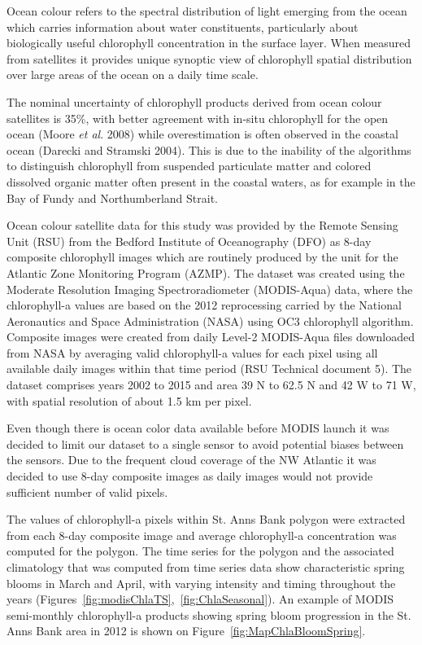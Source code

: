 \documentclass[letterpaper,portrait,11pt]{scrartcl}
\numberwithin{equation}{section}		%
\numberwithin{figure}{section}		%
\numberwithin{table}{section}				%
\begin{document}
Ocean colour refers to the spectral distribution of light emerging from the ocean which carries information about water constituents, particularly about biologically useful chlorophyll concentration in the surface layer. When measured from satellites it provides unique synoptic view of chlorophyll spatial distribution over large areas of the ocean on a daily time scale.

The nominal uncertainty of chlorophyll products derived from ocean colour satellites is 35\%, with better agreement with in-situ chlorophyll for the open ocean (Moore \textit{et al}. 2008) while overestimation is often observed in the coastal ocean (Darecki and Stramski 2004). This is due to the inability of the algorithms to distinguish chlorophyll from suspended particulate matter and colored dissolved organic matter often present in the coastal waters, as for example in the Bay of Fundy and Northumberland Strait.

Ocean colour satellite data for this study was provided by the Remote Sensing Unit (RSU) from the Bedford Institute of Oceanography (DFO) as 8-day composite chlorophyll images which are routinely produced by the unit for the Atlantic Zone Monitoring Program (AZMP). The dataset was created using the Moderate Resolution Imaging Spectroradiometer (MODIS-Aqua) data, where the chlorophyll-a values are based on the 2012 reprocessing carried by the National Aeronautics and Space Administration (NASA) using OC3 chlorophyll algorithm. Composite images were created from daily Level-2 MODIS-Aqua files downloaded from NASA by averaging valid chlorophyll-a values for each pixel using all available daily images within that time period (RSU Technical document 5). The dataset comprises years 2002 to 2015 and area 39 N to 62.5 N and 42 W to 71 W, with spatial resolution of about 1.5 km per pixel. 

Even though there is ocean color data available before MODIS launch it was decided to limit our dataset to a single sensor to avoid potential biases between the sensors. Due to the frequent cloud coverage of the NW Atlantic it was decided to use 8-day composite images as daily images would not provide sufficient number of valid pixels. 

The values of chlorophyll-a pixels within St. Anns Bank polygon were extracted from each 8-day composite image and average chlorophyll-a concentration was computed for the polygon. The time series for the polygon and the associated climatology that was computed from time series data show characteristic spring blooms in March and April, with varying intensity and timing throughout the years (Figures~\ref{fig:modisChlaTS},~\ref{fig:ChlaSeasonal}). An example of MODIS semi-monthly chlorophyll-a products showing spring bloom progression in the St. Anns Bank area in 2012 is shown on Figure~\ref{fig:MapChlaBloomSpring}.
\end{document}
